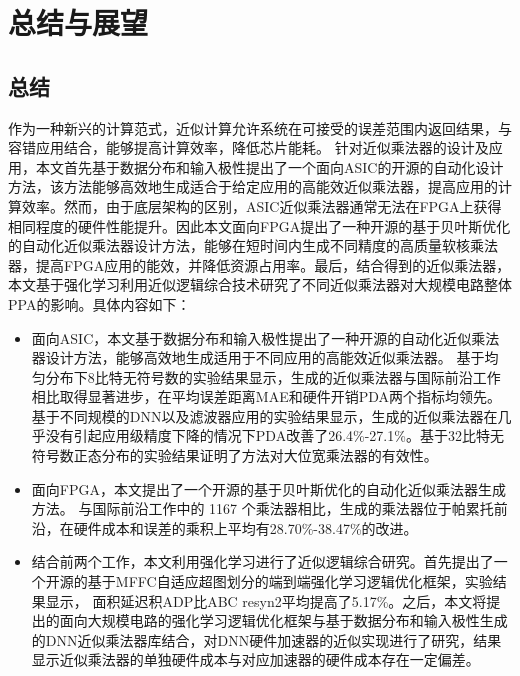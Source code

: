 \chapter{总结与展望}

\section{总结}

作为一种新兴的计算范式，近似计算允许系统在可接受的误差范围内返回结果，与容错应用结合，能够提高计算效率，降低芯片能耗。
针对近似乘法器的设计及应用，本文首先基于数据分布和输入极性提出了一个面向ASIC的开源的自动化设计方法，该方法能够高效地生成适合于给定应用的高能效近似乘法器，提高应用的计算效率。然而，由于底层架构的区别，ASIC近似乘法器通常无法在FPGA上获得相同程度的硬件性能提升。因此本文面向FPGA提出了一种开源的基于贝叶斯优化的自动化近似乘法器设计方法，能够在短时间内生成不同精度的高质量软核乘法器，提高FPGA应用的能效，并降低资源占用率。最后，结合得到的近似乘法器，本文基于强化学习利用近似逻辑综合技术研究了不同近似乘法器对大规模电路整体PPA的影响。具体内容如下：

\begin{itemize}
    \item 面向ASIC，本文基于数据分布和输入极性提出了一种开源的自动化近似乘法器设计方法，能够高效地生成适用于不同应用的高能效近似乘法器。
    基于均匀分布下8比特无符号数的实验结果显示，生成的近似乘法器与国际前沿工作相比取得显著进步，在平均误差距离MAE和硬件开销PDA两个指标均领先。基于不同规模的DNN以及滤波器应用的实验结果显示，生成的近似乘法器在几乎没有引起应用级精度下降的情况下PDA改善了26.4\%-27.1\%。基于32比特无符号数正态分布的实验结果证明了方法对大位宽乘法器的有效性。

    \item 面向FPGA，本文提出了一个开源的基于贝叶斯优化的自动化近似乘法器生成方法。
    与国际前沿工作中的 1167 个乘法器相比，生成的乘法器位于帕累托前沿，在硬件成本和误差的乘积上平均有28.70\%-38.47\%的改进。

    \item 结合前两个工作，本文利用强化学习进行了近似逻辑综合研究。首先提出了一个开源的基于MFFC自适应超图划分的端到端强化学习逻辑优化框架，实验结果显示，
    面积延迟积ADP比ABC resyn2平均提高了5.17\%。之后，本文将提出的面向大规模电路的强化学习逻辑优化框架与基于数据分布和输入极性生成的DNN近似乘法器库结合，对DNN硬件加速器的近似实现进行了研究，结果显示近似乘法器的单独硬件成本与对应加速器的硬件成本存在一定偏差。
\end{itemize}

